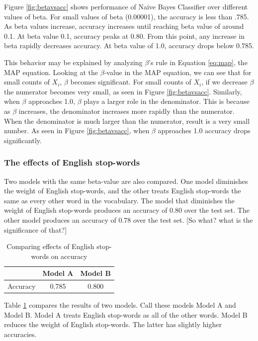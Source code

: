 \documentclass{IEEEtran}
\begin{document}
Figure \ref{fig:betavsacc} shows performance of Naive Bayes Classifier over different values of beta. For small values of beta (0.00001), the accuracy is less than .785. As beta values increase, accuracy increases until reaching beta value of around 0.1. At beta value 0.1, accuracy peaks at 0.80. From this point, any increase in beta rapidly decreases accuracy. At beta value of 1.0, accuracy drops below 0.785.

This behavior may be explained by analyzing $\beta$'s rule in Equation \ref{eq:map}, the MAP equation. Looking at the $\beta$-value in the MAP equation, we can see that for small counts of $X_i$, $\beta$ becomes significant. For small counts of $X_i$, if we decrease $\beta$ the numerator becomes very small, as seen in Figure \ref{fig:betavsacc}. Similarly, when $\beta$ approaches 1.0, $\beta$ plays a larger role in the denominator. This is because as $\beta$ increases, the denominator increases more rapidly than the numerator. When the denominator is much larger than the numerator, result is a very small number. As seen in Figure \ref{fig:betavsacc}, when $\beta$ approaches 1.0 accuracy drops significantly.

\subsubsection{The effects of English stop-words}
Two models with the same beta-value are also compared. One model diminishes the weight of English stop-words, and the other treats English stop-words the same as every other word in the vocabulary. The model that diminishes the weight of English stop-words produces an accuracy of 0.80 over the test set. The other model produces an accuracy of 0.78 over the test set. [So what? what is the significance of that?]

\begin{table}[ht]
  \caption{Comparing effects of English stop-words on accuracy}
  \centering
  \begin{tabular}{c c c }
  \hline\hline
           & Model A & Model B \\ [0.5ex]
  \hline
  Accuracy &   0.785 &   0.800 \\ [1ex]
  \hline
  \end{tabular}
  \label{table:stopwords}
\end{table}

Table \ref{table:stopwords} compares the results of two models. Call these models Model A and Model B. Model A treats English stop-words as all of the other words. Model B reduces the weight of English stop-words. The latter has slightly higher accuracies.
\end{document}
